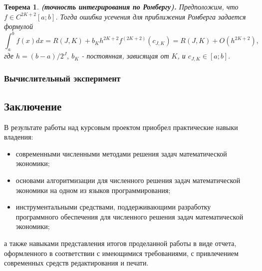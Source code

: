 \documentclass[14pt, titlepage, a4paper]{extarticle} %
\newtheorem{theorem}{Теорема}
\begin{document}
	\begin{theorem}\label{th:7}
		\textbf{(точность интегрирования по Ромбергу).} Предположим, что $f \in C^{2K+2}[a;b]$. Тогда ошибка усечения для приближения Ромберга задается формулой
		\begin{equation}\label{eq:34}
			\int_{a}^{b}{f(x)dx} = R(J,K) + b_Kh^{2K+2}f^{(2K+2)}(c_{J,K}) = R(J,K) + O(h^{2K+2}),
		\end{equation}	
		где $h = (b-a)/2^J,~b_K$ - постоянная, зависящая от $K$, и $c_{J,K}\in[a;b].$
	\end{theorem}
	
	
	
	
	\subsubsection*{Вычислительный эксперимент}
	
	
	
	\pagebreak
	
	
	\subsection*{Заключение}
	
	В результате работы над курсовым проектом приобрел практические навыки владения:
	\begin{itemize}
		\item современными численными методами решения задач математической экономики;
		\item основами алгоритмизации для численного решения задач математической экономики на одном из языков программирования;
		\item инструментальными средствами, поддерживающими разработку программного обеспечения для численного решения задач математической экономики; 
	\end{itemize}
	а также навыками представления итогов проделанной работы в виде отчета, оформленного в соответствии с имеющимися требованиями, с привлечением современных средств редактирования и печати.
	
\end{document}
